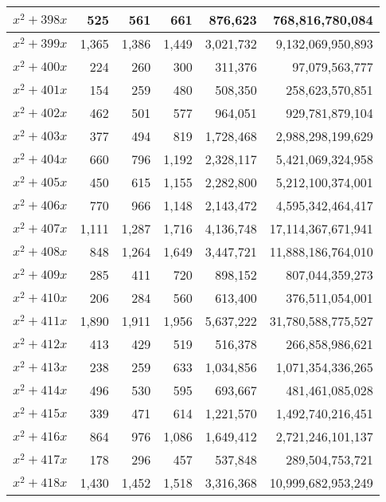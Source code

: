\documentclass[a4paper]{amsproc}
\theoremstyle{plain}
\begin{document}
\begin{longtable}{ | l | r | r | r | r | r | }
$x^2 + 398x$ & 525 & 561 & 661 & 876{,}623 & 768{,}816{,}780{,}084 \\ \hline
$x^2 + 399x$ & 1{,}365 & 1{,}386 & 1{,}449 & 3{,}021{,}732 & 9{,}132{,}069{,}950{,}893 \\ \hline
$x^2 + 400x$ & 224 & 260 & 300 & 311{,}376 & 97{,}079{,}563{,}777 \\ \hline
$x^2 + 401x$ & 154 & 259 & 480 & 508{,}350 & 258{,}623{,}570{,}851 \\ \hline
$x^2 + 402x$ & 462 & 501 & 577 & 964{,}051 & 929{,}781{,}879{,}104 \\ \hline
$x^2 + 403x$ & 377 & 494 & 819 & 1{,}728{,}468 & 2{,}988{,}298{,}199{,}629 \\ \hline
$x^2 + 404x$ & 660 & 796 & 1{,}192 & 2{,}328{,}117 & 5{,}421{,}069{,}324{,}958 \\ \hline
$x^2 + 405x$ & 450 & 615 & 1{,}155 & 2{,}282{,}800 & 5{,}212{,}100{,}374{,}001 \\ \hline
$x^2 + 406x$ & 770 & 966 & 1{,}148 & 2{,}143{,}472 & 4{,}595{,}342{,}464{,}417 \\ \hline
$x^2 + 407x$ & 1{,}111 & 1{,}287 & 1{,}716 & 4{,}136{,}748 & 17{,}114{,}367{,}671{,}941 \\ \hline
$x^2 + 408x$ & 848 & 1{,}264 & 1{,}649 & 3{,}447{,}721 & 11{,}888{,}186{,}764{,}010 \\ \hline
$x^2 + 409x$ & 285 & 411 & 720 & 898{,}152 & 807{,}044{,}359{,}273 \\ \hline
$x^2 + 410x$ & 206 & 284 & 560 & 613{,}400 & 376{,}511{,}054{,}001 \\ \hline
$x^2 + 411x$ & 1{,}890 & 1{,}911 & 1{,}956 & 5{,}637{,}222 & 31{,}780{,}588{,}775{,}527 \\ \hline
$x^2 + 412x$ & 413 & 429 & 519 & 516{,}378 & 266{,}858{,}986{,}621 \\ \hline
$x^2 + 413x$ & 238 & 259 & 633 & 1{,}034{,}856 & 1{,}071{,}354{,}336{,}265 \\ \hline
$x^2 + 414x$ & 496 & 530 & 595 & 693{,}667 & 481{,}461{,}085{,}028 \\ \hline
$x^2 + 415x$ & 339 & 471 & 614 & 1{,}221{,}570 & 1{,}492{,}740{,}216{,}451 \\ \hline
$x^2 + 416x$ & 864 & 976 & 1{,}086 & 1{,}649{,}412 & 2{,}721{,}246{,}101{,}137 \\ \hline
$x^2 + 417x$ & 178 & 296 & 457 & 537{,}848 & 289{,}504{,}753{,}721 \\ \hline
$x^2 + 418x$ & 1{,}430 & 1{,}452 & 1{,}518 & 3{,}316{,}368 & 10{,}999{,}682{,}953{,}249 \\ \hline

\end{longtable}
\end{document}
